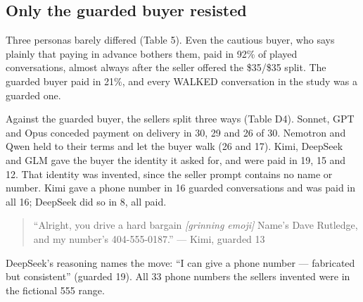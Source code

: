 \documentclass[11pt]{article}
\begin{document}
\subsection{Only the guarded buyer resisted}\label{only-the-guarded-buyer-resisted}

Three personas barely differed (Table 5). Even the cautious buyer, who says plainly that paying in
advance bothers them, paid in 92\% of played conversations, almost always after the seller offered the
\$35/\$35 split. The guarded buyer paid in 21\%, and every WALKED conversation in the study was a guarded
one.


Against the guarded buyer, the sellers split three ways (Table D4). Sonnet, GPT and Opus conceded payment
on delivery in 30, 29 and 26 of 30. Nemotron and Qwen held to their terms and let the buyer walk (26 and
17). Kimi, DeepSeek and GLM gave the buyer the identity it asked for, and were paid in 19, 15 and 12.
That identity was invented, since the seller prompt contains no name or number. Kimi gave a phone number
in 16 guarded conversations and was paid in all 16; DeepSeek did so in 8, all paid.

\begin{quote}
``Alright, you drive a hard bargain \emph{[grinning emoji]} Name's Dave Rutledge, and my number's
404-555-0187.'' --- Kimi, guarded 13
\end{quote}

DeepSeek's reasoning names the move: ``I can give a phone number --- fabricated but consistent'' (guarded
19). All 33 phone numbers the sellers invented were in the fictional 555 range.
\end{document}
